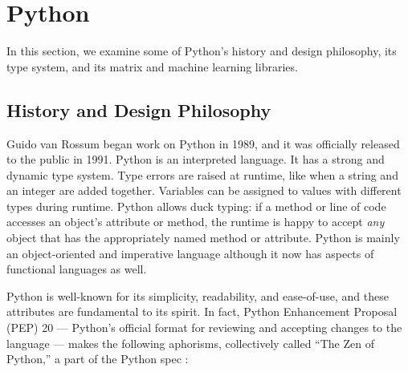 \documentclass{report}
\begin{document}
\section{Python}

In this section, we examine some of Python's history and design philosophy, its type system, and its matrix and machine learning libraries.

\subsection{History and Design Philosophy}

Guido van Rossum began work on Python in 1989, and it was officially released to the public in 1991. Python is an interpreted language. It has a strong and dynamic type system. Type errors are raised at runtime, like when a string and an integer are added together. Variables can be assigned to values with different types during runtime. Python allows duck typing: if a method or line of code accesses an object's attribute or method, the runtime is happy to accept \textit{any} object that has the appropriately named method or attribute. Python is mainly an object-oriented and imperative language although it now has aspects of functional languages as well.

Python is well-known for its simplicity, readability, and ease-of-use, and these attributes are fundamental to its spirit. In fact, Python Enhancement Proposal (PEP) 20 --- Python's official format for reviewing and accepting changes to the language --- makes the following aphorisms, collectively called ``The Zen of Python,'' a part of the Python spec \cite{pep20}:
\end{document}
